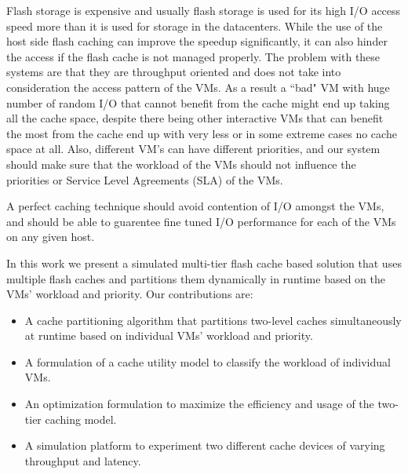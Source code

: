 Flash storage is expensive and usually flash storage is used for its high I/O access speed more than it is used for storage in the datacenters. While the use of the host side flash caching can improve the speedup significantly, it can also hinder the access if the flash cache is not managed properly. The problem with these systems are that they are throughput oriented and does not take into consideration the access pattern of the VMs. As a result a ``bad" VM with huge number of random I/O that cannot benefit from the cache might end up taking all the cache space, despite there being other interactive VMs that can benefit the most from the cache end up with very less or in some extreme cases no cache space at all. Also, different VM's can have different priorities, and our system should make sure that the workload of the VMs should not influence the priorities or Service Level Agreements (SLA) of the VMs.

A perfect caching technique should avoid contention of I/O amongst the VMs, and should be able to guarentee fine tuned I/O performance for each of the VMs on any given host.

In this work we present a simulated multi-tier flash cache based solution that uses multiple flash caches and partitions them dynamically in runtime based on the VMs' workload and priority. Our contributions are:
\begin{itemize}
\item A cache partitioning algorithm that partitions two-level caches simultaneously at runtime based on individual VMs' workload and priority.
\item A formulation of a cache utility model to classify the workload of individual VMs.
\item An optimization formulation to maximize the efficiency and usage of the two-tier caching model.
\item A simulation platform to experiment two different cache devices of varying throughput and latency.
\end{itemize}
